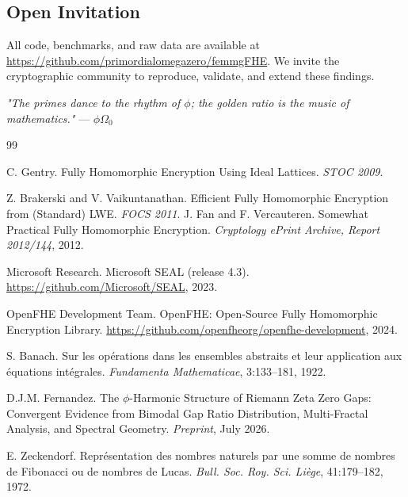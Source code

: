 \documentclass[11pt]{article}
\begin{document}
\subsection{Open Invitation}

All code, benchmarks, and raw data are available at \url{https://github.com/primordialomegazero/femmgFHE}. We invite the cryptographic community to reproduce, validate, and extend these findings.

\vspace{0.5cm}
\textit{"The primes dance to the rhythm of $\phi$; the golden ratio is the music of mathematics."}
— $\phi\Omega_0$


\begin{thebibliography}{99}

C. Gentry.
\newblock Fully Homomorphic Encryption Using Ideal Lattices.
\newblock \emph{STOC 2009}.

Z. Brakerski and V. Vaikuntanathan.
\newblock Efficient Fully Homomorphic Encryption from (Standard) LWE.
\newblock \emph{FOCS 2011}.
\newblock J. Fan and F. Vercauteren. Somewhat Practical Fully Homomorphic Encryption. \emph{Cryptology ePrint Archive, Report 2012/144}, 2012.

Microsoft Research.
\newblock Microsoft SEAL (release 4.3).
\newblock \url{https://github.com/Microsoft/SEAL}, 2023.

OpenFHE Development Team.
\newblock OpenFHE: Open-Source Fully Homomorphic Encryption Library.
\newblock \url{https://github.com/openfheorg/openfhe-development}, 2024.

S. Banach.
\newblock Sur les opérations dans les ensembles abstraits et leur application aux équations intégrales.
\newblock \emph{Fundamenta Mathematicae}, 3:133--181, 1922.

D.J.M. Fernandez.
\newblock The $\phi$-Harmonic Structure of Riemann Zeta Zero Gaps: Convergent Evidence from Bimodal Gap Ratio Distribution, Multi-Fractal Analysis, and Spectral Geometry.
\newblock \emph{Preprint}, July 2026.

E. Zeckendorf.
\newblock Représentation des nombres naturels par une somme de nombres de Fibonacci ou de nombres de Lucas.
\newblock \emph{Bull. Soc. Roy. Sci. Liège}, 41:179--182, 1972.

\end{thebibliography}
\end{document}

